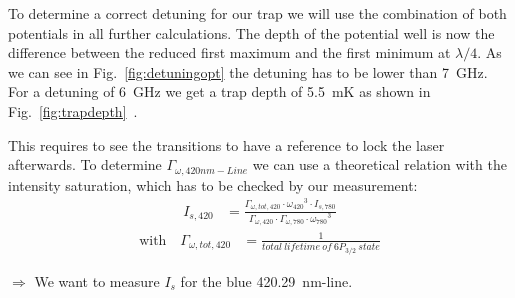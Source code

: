 To determine a correct detuning for our trap we will use the combination of both 
potentials in all further calculations. The depth of the potential well is now
the difference between the reduced first maximum and the first minimum at
\(\lambda/4 \). As we can see in Fig.~\ref{fig:detuningopt}
the detuning has to be lower than \SI{7}{\giga\hertz}. For a detuning of \SI{6}{\giga\hertz}
we get a trap depth of \SI{5.5}{\milli\kelvin} as shown in Fig.~\ref{fig:trapdepth}~.  
  





\pagebreak

This requires to see the transitions to have a reference to lock the laser afterwards.
\bigskip
To determine \(\Gamma_{\omega,420nm-Line} \) we can use a theoretical relation with the intensity saturation, which has to be checked by our measurement:
\begin{align}
    I_{s,420} &= \frac{\Gamma_{\omega,tot,420}\cdot{\omega_{420}}^3\cdot I_{s,780}}{\Gamma_{\omega,420}\cdot\Gamma_{\omega,780}\cdot{\omega_{780}}^3}
\end{align}
\begin{align*}
    \text{with~~~} \Gamma_{\omega,tot,420} &= \frac{1}{total~lifetime~of~6P_{3/2}~state}
\end{align*}
\medskip


\(\Rightarrow \) We want to measure \(I_{s}\) for the blue \SI{420.29}{\nano\meter}-line. 

